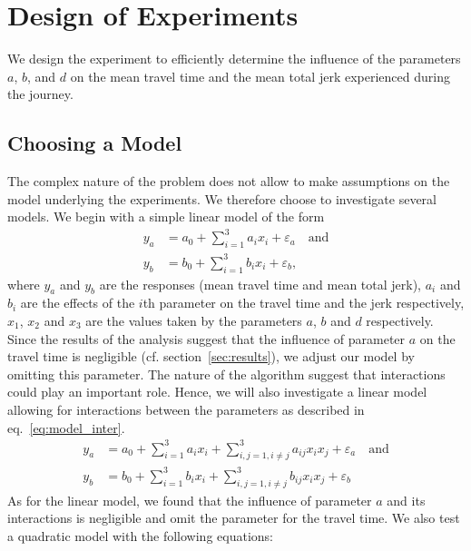 \section{Design of Experiments}

We design the experiment to efficiently determine the influence of the  parameters $a$, $b$, and $d$ on the mean travel time and the mean total jerk experienced during the journey.

\subsection{Choosing a Model}
The complex nature of the problem does not allow to make assumptions on the model underlying the experiments. We therefore choose to investigate several models. We begin with a simple linear model of the form
\begin{subequations}\label{eq:model_lin}
\begin{align}
	y_a &= a_0 + \displaystyle\sum_{i=1}^{3} a_i x_i + \varepsilon_a \quad \text{and}\\ 
	y_b &= b_0 + \displaystyle\sum_{i=1}^{3} b_i x_i + \varepsilon_b,
\end{align}
\end{subequations}
where $y_a$ and $y_b$ are the responses (mean travel time and mean total jerk), $a_i$ and $b_i$ are the effects of the $i$th parameter on the travel time and the jerk respectively, $x_1$, $x_2$ and $x_3$ are the values taken by the parameters $a$, $b$ and $d$ respectively. Since the results of the analysis suggest that the influence of parameter $a$ on the travel time is negligible (cf. section~\ref{sec:results}), we adjust our model by omitting this parameter.
The nature of the algorithm suggest that interactions could play an important role. Hence, we will also investigate a linear model allowing for interactions between the parameters as described in eq.~\ref{eq:model_inter}.
\begin{subequations}\label{eq:model_inter}
\begin{align}
	y_a &= a_0 + \displaystyle\sum_{i=1}^{3} a_i x_i + \displaystyle\sum_{i,j=1, i \neq j}^{3} a_{ij} x_i x_j + \varepsilon_a \quad \text{and}\\ 
	y_b &= b_0 + \displaystyle\sum_{i=1}^{3} b_i x_i + \displaystyle\sum_{i,j=1, i \neq j}^{3} b_{ij} x_i x_j + \varepsilon_b
\end{align}
\end{subequations}
As for the linear model, we found that the influence of parameter $a$ and its interactions is negligible and omit the parameter for the travel time. We also test a quadratic model with the following equations:
